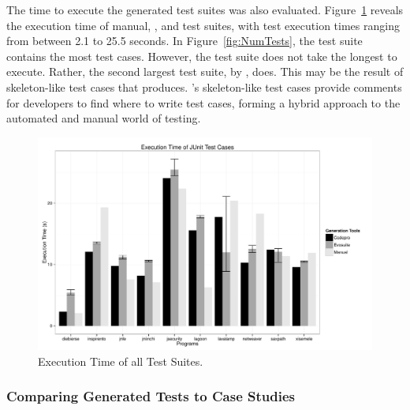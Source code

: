 The time to execute the generated test suites was also evaluated. Figure~\ref{fig:TestExecTime} reveals the execution time of manual, \evo, and \codepro test suites, with test execution times ranging from between 2.1 to 25.5 seconds. In Figure~\ref{fig:NumTests}, the \netweaver test suite contains the most test cases. However, the \netweaver \codepro test suite does not take the longest to execute.  Rather, the second largest test suite, \jsecurity by \evo, does. This may be the result of skeleton-like test cases that \codepro produces. \codepro's skeleton-like test cases provide comments for developers to find where to write test cases, forming a hybrid approach to the automated and manual world of testing.%

\begin{figure}[!t]
\centering
  \includegraphics[scale=0.4]{RGraphs/TestExecutionTime.pdf}
    \caption{Execution Time of all Test Suites.}
  \label{fig:TestExecTime}
\end{figure}

\subsubsection{Comparing Generated Tests to Case Studies}

